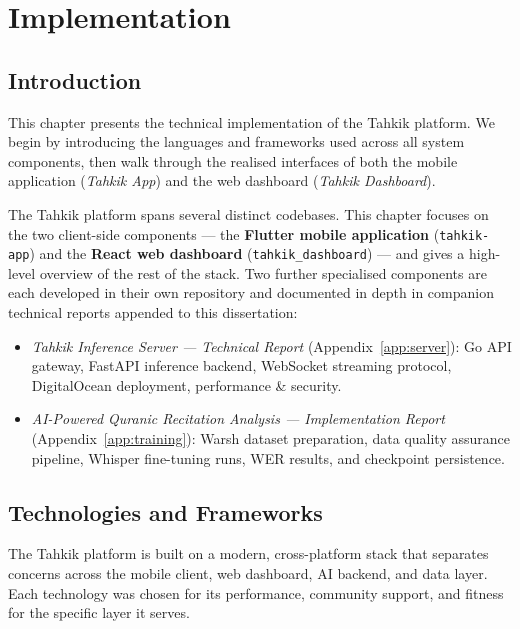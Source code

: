 \chapter{Implementation}
\label{ch:implementation}

\section{Introduction}
This chapter presents the technical implementation of the Tahkik platform. We begin by introducing the languages and frameworks used across all system components, then walk through the realised interfaces of both the mobile application (\textit{Tahkik App}) and the web dashboard (\textit{Tahkik Dashboard}).

\begin{infobox}[title=Scope of this Chapter]
The Tahkik platform spans several distinct codebases. This chapter focuses on the two client-side components --- the \textbf{Flutter mobile application} (\texttt{tahkik-app}) and the \textbf{React web dashboard} (\texttt{tahkik\_dashboard}) --- and gives a high-level overview of the rest of the stack. Two further specialised components are each developed in their own repository and documented in depth in companion technical reports appended to this dissertation:
\begin{itemize}[leftmargin=2em]
  \item \textit{Tahkik Inference Server --- Technical Report} (Appendix~\ref{app:server}): Go API gateway, FastAPI inference backend, WebSocket streaming protocol, DigitalOcean deployment, performance \& security.
  \item \textit{AI-Powered Quranic Recitation Analysis --- Implementation Report} (Appendix~\ref{app:training}): Warsh dataset preparation, data quality assurance pipeline, Whisper fine-tuning runs, WER results, and checkpoint persistence.
\end{itemize}
\end{infobox}

\section{Technologies and Frameworks}
\label{sec:impl_tech}

\begin{emeraldbox}[title=Technology Stack]
The Tahkik platform is built on a modern, cross-platform stack that separates concerns across the mobile client, web dashboard, AI backend, and data layer. Each technology was chosen for its performance, community support, and fitness for the specific layer it serves.
\end{emeraldbox}

